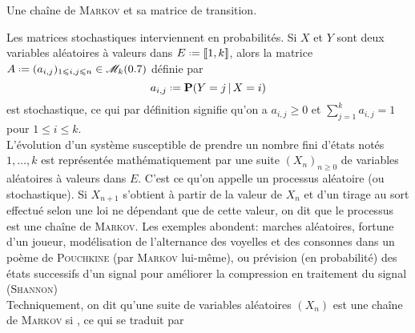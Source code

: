 
\begin{marginfigure}[3.5cm]
    \centering
    
    \caption*{\centering Une chaîne de \textsc{Markov} et sa matrice de transition.}
\end{marginfigure}

Les matrices stochastiques 
interviennent en probabilités. Si $X$ et $Y$ sont deux variables aléatoires à valeurs dans $E \defeq \llbracket 1, k \rrbracket$, alors la matrice $A \defeq (a_{i,j})_{1 \leqslant i,j \leqslant n} \in \M_k(\R)$ définie par 
$$a_{i,j} \defeq \P(Y = j \,|\, X = i)$$
est stochastique, ce qui par définition signifie qu'on a $a_{i,j} \geqslant 0$ et $\sum\limits_{j=1}^k a_{i,j} = 1$ pour $1 \leqslant i \leqslant k$. \\
L'évolution d'un système susceptible de prendre un nombre fini d'états notés $1, \dots, k$ est représentée mathématiquement par une suite $(X_n)_{n \geqslant 0}$ de variables aléatoires à valeurs dans $E$. C'est ce qu'on appelle un processus aléatoire (ou stochastique). Si $X_{n+1}$ s'obtient à partir de la valeur de $X_n$ et d'un tirage au sort effectué selon une loi ne dépendant que de cette valeur, on dit que le processus est une chaîne de \textsc{Markov}. Les exemples abondent: marches aléatoires, fortune d'un joueur, modélisation de l'alternance des voyelles et des consonnes dans un poème de \textsc{Pouchkine} (par \textsc{Markov} lui-même), ou prévision (en probabilité) des états  successifs d'un signal pour améliorer la compression en traitement du signal (\textsc{Shannon}) \\
Techniquement, on dit qu'une suite de variables aléatoires $(X_n)$ est une chaîne de \textsc{Markov} si , ce qui se traduit par

